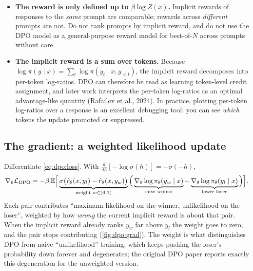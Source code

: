 \begin{itemize}
\item \textbf{The reward is only defined up to $\beta\log Z(x)$.} Implicit rewards of responses to
  the \emph{same} prompt are comparable; rewards across \emph{different} prompts are not. Do not
  rank prompts by implicit reward, and do not use the DPO model as a general-purpose reward model
  for best-of-$N$ across prompts without care.
\item \textbf{The implicit reward is a sum over tokens.} Because
  $\log\pi(y\mid x)=\sum_t\log\pi(y_t\mid x,y_{<t})$, the implicit reward decomposes into per-token
  log-ratios. DPO can therefore be read as learning token-level credit assignment, and later work
  interprets the per-token log-ratios as an optimal advantage-like quantity (Rafailov et al., 2024).
  In practice, plotting per-token log-ratios over a response is an excellent debugging tool:
  you can see \emph{which} tokens the update promoted or suppressed.
\end{itemize}

\subsection{The gradient: a weighted likelihood update}\label{sec:dpo:grad}

Differentiate \eqref{eq:dpo:loss}. With $\frac{d}{dh}[-\log\sigma(h)]=-\sigma(-h)$,
\begin{equation}
\nabla_\theta\mathcal{L}_{\text{DPO}} = -\beta\,\mathbb{E}\Big[\underbrace{\sigma\big(\hat r_\theta(x,y_l)-\hat r_\theta(x,y_w)\big)}_{\text{weight }w\in(0,1)}
\Big(\underbrace{\nabla_\theta\log\pi_\theta(y_w\mid x)}_{\text{raise winner}}
-\underbrace{\nabla_\theta\log\pi_\theta(y_l\mid x)}_{\text{lower loser}}\Big)\Big].
\label{eq:dpo:grad}
\end{equation}
Each pair contributes ``maximum likelihood on the winner, unlikelihood on the loser'', weighted
by how \emph{wrong} the current implicit reward is about that pair. When the implicit reward
already ranks $y_w$ far above $y_l$ the weight goes to zero, and the pair stops contributing
(\cref{fig:dpo:grad}). The weight is what distinguishes DPO from naive ``unlikelihood'' training,
which keeps pushing the loser's probability down forever and degenerates; the original DPO paper
reports exactly this degeneration for the unweighted version.

